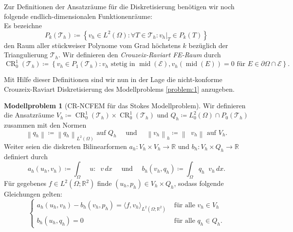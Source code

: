 \documentclass[a4paper]{scrartcl}
\newcommand{\real}{\mathbb{R}}
\newcommand{\Ltwo}{L^2}
\newcommand{\crfem}{\operatorname{CR}_0^1}
\newcommand{\mesh}{\mathcal{T}_h}
\newcommand{\edges}{\mathcal{E}}
\newcommand{\dx}{\,dx}
\newcommand{\norm}[1]{\left\lVert#1\right\rVert}
\newcommand{\hnorm}[1]{\left\lVert#1\right\rVert_h}
\newcommand{\set}[1]{\left\{#1\right\}}
\DeclareMathOperator{\divh}{div_h}
\DeclareMathOperator{\nablah}{\nabla_{\textit{h}}}
\DeclareMathOperator{\midOp}{mid}
\theoremstyle{plain}
\theoremstyle{definition}
\newtheorem{modellproblem}{Modellproblem}
\theoremstyle{remark}
\begin{document}
\noindent Zur Definitionen der Ansatzräume für die Diskretisierung
benötigen wir noch folgende endlich-dimensionalen Funktionenräume: \\
Es bezeichne 
\[P_k(\mesh) \coloneqq \set{v_h \in \Ltwo(\Omega)\colon \forall T \in
  \mesh\colon v_h|_T \in P_k(T)}\]
den Raum aller stückweiser Polynome vom Grad höchstens \(k\) bezüglich
der Triangulierung \(\mesh\). Wir definieren den \emph{Crouzeix-Raviart
FE-Raum} durch 
\begin{equation}
  \label{eq:9}
  \crfem(\mesh) \coloneqq \set{v_h \in P_1(\mesh)\colon v_h \text{ stetig in } \midOp(\edges), v_h(\midOp(E)) = 0 \text{ für } E \in \partial\Omega\cap\edges}.
\end{equation}

\noindent Mit Hilfe dieser Definitionen sind wir nun in der Lage die
nicht-konforme Crouzeix-Raviart Diskretisierung des Modellproblems
\ref{problem:1} anzugeben. 

\begin{modellproblem}[CR-NCFEM für das Stokes
  Modellproblem] \label{problem:3}
  Wir definieren die Ansatzräume \(V_h \coloneqq \crfem(\mesh) \times
  \crfem(\mesh)\) und \(Q_h \coloneqq \Ltwo_0(\Omega) \cap
  P_0(\mesh)\) zusammen mit den Normen 
  \begin{equation}
    \label{eq:10}
    \norm{q_h} \coloneqq \norm{q_h}_{\Ltwo(\Omega)} \text{ auf } Q_h
    \quad \text{ und } \quad
    \hnorm{v_h} \coloneqq \norm{\nablah v_h} \text{ auf } V_h. 
  \end{equation}
  Weiter seien die diskreten Bilinearformen \(a_h\colon V_h \times V_h
  \rightarrow \real\) und \(b_h\colon V_h \times Q_h \rightarrow
  \real\) definiert durch
  \begin{equation}
    \label{eq:11}
    a_h(u_h, v_h) \coloneqq \int_\Omega \nablah u : \nablah v \dx
    \quad \text{ und } \quad b_h(v_h, q_h) \coloneqq \int_\Omega q_h\divh v_h \dx. 
  \end{equation}
  Für gegebenes \(f \in \Ltwo(\Omega; \real^2)\) finde \((u_h, p_h)
  \in V_h \times Q_h\), sodass folgende Gleichungen gelten: 
  \begin{equation}
    \label{eq:12}
    \begin{cases}
      a_h(u_h, v_h) - b_h(v_h, p_h) = \langle f, v_h \rangle_{\Ltwo(\Omega; \real^2)} & \text{ für alle } v_h \in V_h \\
      b_h(u_h, q_h) = 0 & \text{ für alle } q_h \in Q_h. 
    \end{cases}
  \end{equation}
  \end{modellproblem}
\end{document}
